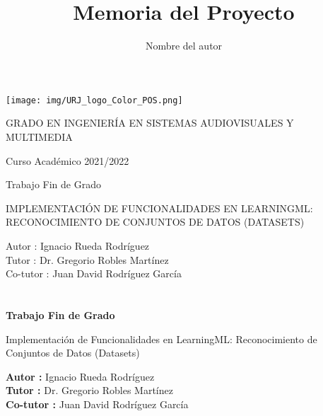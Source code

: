 \documentclass[a4paper, 12pt]{book}
\title{Memoria del Proyecto}
\author{Nombre del autor}
\begin{document}
\renewcommand{\refname}{Bibliografía}  %
\renewcommand{\appendixname}{Apéndice}


\begin{titlepage}
\begin{center}
\texttt{[image: img/URJ\_logo\_Color\_POS.png]}

\vspace{1.75cm}

\Large
GRADO EN INGENIERÍA EN SISTEMAS AUDIOVISUALES Y MULTIMEDIA

\vspace{0.4cm}

\large
Curso Académico 2021/2022

\vspace{0.8cm}

Trabajo Fin de Grado

\vspace{2.5cm}

\LARGE
IMPLEMENTACIÓN DE FUNCIONALIDADES EN LEARNINGML: RECONOCIMIENTO DE CONJUNTOS DE DATOS (DATASETS)

\vspace{3cm}

\large
Autor : Ignacio Rueda Rodríguez \\
Tutor : Dr. Gregorio Robles Martínez \\
Co-tutor : Juan David Rodríguez García
\end{center}
\end{titlepage}

\newpage
\mbox{}
\thispagestyle{empty} %


\clearpage
{}
\chapter*{}

\vspace{-4cm}
\begin{center}
\LARGE
\textbf{Trabajo Fin de Grado}

\vspace{1cm}
\large
Implementación de Funcionalidades en LearningML: Reconocimiento de Conjuntos de Datos (Datasets)

\vspace{1cm}
\large
\textbf{Autor :} Ignacio Rueda Rodríguez \\
\textbf{Tutor :} Dr. Gregorio Robles Martínez \\
\textbf{Co-tutor :} Juan David Rodríguez García

\end{center}
\end{document}
